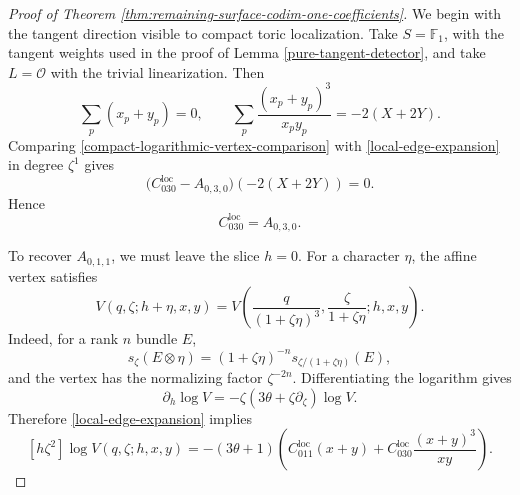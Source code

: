\documentclass[10pt,a4paper]{amsart}
\renewcommand{\O}{\mathcal{O}}
\begin{document}
\begin{proof}[Proof of Theorem
  \ref{thm:remaining-surface-codim-one-coefficients}]
  We begin with the tangent direction visible to compact toric localization.
  Take $S=\mathbb F_1$, with the tangent weights used in the proof of Lemma
  \ref{pure-tangent-detector}, and take $L=\O$ with the trivial
  linearization.  Then
  \[
    \sum_p(x_p+y_p)=0,\qquad
    \sum_p\frac{(x_p+y_p)^3}{x_py_p}=-2(X+2Y).
  \]
  Comparing \eqref{compact-logarithmic-vertex-comparison} with
  \eqref{local-edge-expansion} in degree $\zeta^1$ gives
  \[
    \bigl(C_{030}^{\mathrm{loc}}-A_{0,3,0}\bigr)(-2(X+2Y))=0.
  \]
  Hence
  \[
    C_{030}^{\mathrm{loc}}=A_{0,3,0}.
  \]

  To recover $A_{0,1,1}$, we must leave the slice $h=0$.  For a
  character $\eta$, the affine vertex satisfies
  \[
    V(q,\zeta;h+\eta,x,y)
    =
    V\left(\frac{q}{(1+\zeta\eta)^3},
    \frac{\zeta}{1+\zeta\eta};h,x,y\right).
  \]
  Indeed, for a rank $n$ bundle $E$,
  \[
    s_\zeta(E\otimes\eta)
    =(1+\zeta\eta)^{-n}s_{\zeta/(1+\zeta\eta)}(E),
  \]
  and the vertex has the normalizing factor $\zeta^{-2n}$. Differentiating the
  logarithm gives
  \[
    \partial_h\log V
    =-\zeta(3\theta+\zeta\partial_\zeta)\log V.
  \]
  Therefore \eqref{local-edge-expansion} implies
  \begin{equation}\label{local-horizontal-edge}
    [h\zeta^2]\log V(q,\zeta;h,x,y)
    =
    -(3\theta+1)
    \left(
      C_{011}^{\mathrm{loc}}(x+y)
      +
      C_{030}^{\mathrm{loc}}\frac{(x+y)^3}{xy}
    \right).
  \end{equation}


\end{proof}
\end{document}
